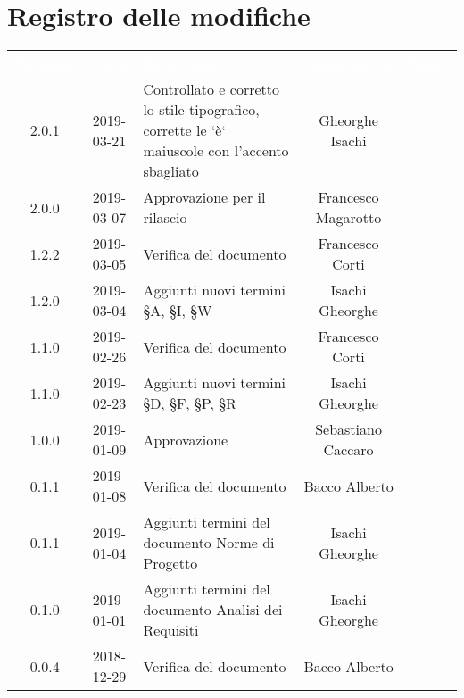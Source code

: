 
\section*{Registro delle modifiche}
{
	\renewcommand{\arraystretch}{1.5}
	\centering
	\begin{longtable}{ c c  C{4cm}  c  c }
		
		\textcolor{white}{\textbf{Versione}} & \textcolor{white}{\textbf{Data}} & \textcolor{white}{\textbf{Descrizione}} & \textcolor{white}{\textbf{Nominativo}} & \textcolor{white}{\textbf{Ruolo}}\\

		2.0.1 & 2019-03-21 & Controllato e corretto lo stile tipografico, corrette le `è` maiuscole con l'accento sbagliato &  Gheorghe Isachi & \reda{}\\			
		
		2.0.0 & 2019-03-07 & Approvazione per il rilascio &  Francesco Magarotto & \Res{}\\	

		1.2.2 & 2019-03-05 & Verifica del documento &  Francesco Corti & \ver{}\\		
		
		1.2.0 & 2019-03-04 & Aggiunti nuovi termini  §A, §I, §W & Isachi Gheorghe &\reda{}\\
		
		1.1.0 & 2019-02-26 & Verifica del documento &  Francesco Corti & \ver{}\\
		
		1.1.0 & 2019-02-23 & Aggiunti nuovi termini  §D, §F, §P, §R & Isachi Gheorghe &\reda{}\\
		
		1.0.0 & 2019-01-09 & Approvazione & Sebastiano Caccaro & \Res{}\\
						
		0.1.1 & 2019-01-08 & Verifica del documento & Bacco Alberto & \ver{}\\
		
		0.1.1 & 2019-01-04 & Aggiunti termini del documento Norme di Progetto & Isachi Gheorghe &\reda{}\\
		
		0.1.0 & 2019-01-01 & Aggiunti termini del documento Analisi dei Requisiti & Isachi Gheorghe &\reda{}\\
		
		0.0.4 & 2018-12-29 & Verifica del documento & Bacco Alberto & \ver{}\\
				

\end{longtable}}
